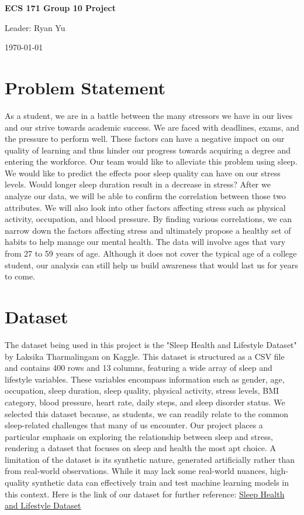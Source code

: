 \documentclass[11pt, letterpaper]{article}
\renewcommand{\maketitle}{
    \begin{titlepage}
        \centering
        \huge{\textbf{ECS 171 Group 10 Project}} \par
        \vspace{.5cm}
        \large{Leader: Ryan Yu} \par
        \vspace{.5cm}
        \normalfont{Amira Basyouni, Calvin Chen, Alexis Lydon, Tianming Tan} \par
        \vspace{.5cm}
        \today
    \end{titlepage}
}
\begin{document}
    \maketitle
    
    \newpage

    \section*{Problem Statement}
    As a student, we are in a battle between the many stressors we have in our lives 
    and our strive towards academic success. We are faced with deadlines, exams, and 
    the pressure to perform well. These factors can have a negative impact on our 
    quality of learning and thus hinder our progress towards acquiring a degree and 
    entering the workforce. Our team would like to alleviate this problem using sleep. 
    We would like to predict the effects poor sleep quality can have on our stress 
    levels. Would longer sleep duration result in a decrease in stress? After we 
    analyze our data, we will be able to confirm the correlation between those two 
    attributes. We will also look into other factors affecting stress such as physical 
    activity, occupation, and blood pressure. By finding various correlations, we can 
    narrow down the factors affecting stress and ultimately propose a healthy set of 
    habits to help manage our mental health. The data will involve ages that vary from 
    27 to 59 years of age. Although it does not cover the typical age of a college 
    student, our analysis can still help us build awareness that would last us for 
    years to come.

    \section*{Dataset}
    The dataset being used in this project is the "Sleep Health and Lifestyle Dataset" 
    by Laksika Tharmalingam on Kaggle. This dataset is structured as a CSV file and contains 
    400 rows and 13 columns, featuring a wide array of sleep and lifestyle variables. These variables 
    encompass information such as gender, age, occupation, sleep duration, sleep quality, physical 
    activity, stress levels, BMI category, blood pressure, heart rate, daily steps, and sleep disorder 
    status. We selected this dataset because, as students, we can readily relate to the common sleep-related 
    challenges that many of us encounter. Our project places a particular emphasis on exploring the relationship 
    between sleep and stress, rendering a dataset that focuses on sleep and health the most apt choice. A limitation 
    of the dataset is its synthetic nature, generated artificially rather than 
    from real-world observations. While it may lack some real-world nuances, high-quality synthetic data can 
    effectively train and test machine learning models in this context. Here is the link
    of our dataset for further reference: \href{https://www.kaggle.com/datasets/uom190346a/sleep-health-and-lifestyle-dataset/data}{Sleep Health and Lifestyle Dataset}
\end{document}
